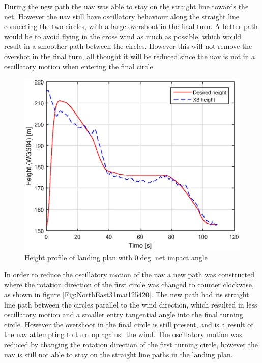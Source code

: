 During the new path the \gls{uav} was able to stay on the straight line towards the net. However the \gls{uav} still have oscillatory behaviour along the straight line connecting the two circles, with a large overshoot in the final turn. A better path would be to avoid flying in the cross wind as much as possible, which would result in a smoother path between the circles. However this will not remove the overshot in the final turn, all thought it will be reduced since the \gls{uav} is not in a oscillatory motion when entering the final circle.
\begin{figure}[H]
\centering
		\includegraphics[scale=0.7]{figs/Experiment/Height31mai105034.eps}
		\caption{Height profile of landing plan with $0 \deg$ net impact angle}
		\label{Fig:Height31mai31mai105034}
\end{figure}
In order to reduce the oscillatory motion of the \gls{uav} a new path was constructed where the rotation direction of the first circle was changed to counter clockwise, as shown in figure \ref{Fig:NorthEast31mai125420}. The new path had its straight line path between the circles parallel to the wind direction, which resulted in less oscillatory motion and a smaller entry tangential angle into the final turning circle. However the overshoot in the final circle is still present, and is a result of the \gls{uav} attempting to turn up against the wind. The oscillatory motion was reduced by changing the rotation direction of the first turning circle, however the \gls{uav} is still not able to stay on the straight line paths in the landing plan. 
